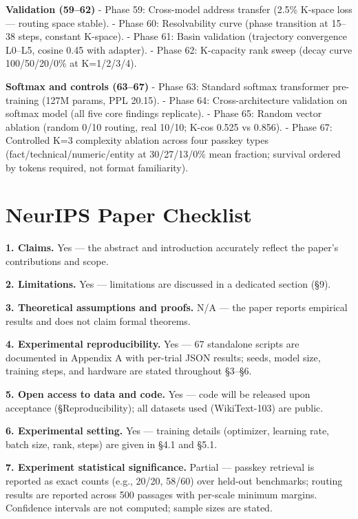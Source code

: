 \textbf{Validation (59--62)} - Phase 59: Cross-model address transfer (2.5\% K-space loss --- routing space stable). - Phase 60: Resolvability curve (phase transition at 15--38 steps, constant K-space). - Phase 61: Basin validation (trajectory convergence L0--L5, cosine 0.45 with adapter). - Phase 62: K-capacity rank sweep (decay curve 100/50/20/0\% at K=1/2/3/4).

\textbf{Softmax and controls (63--67)} - Phase 63: Standard softmax transformer pre-training (127M params, PPL 20.15). - Phase 64: Cross-architecture validation on softmax model (all five core findings replicate). - Phase 65: Random vector ablation (random 0/10 routing, real 10/10; K-cos 0.525 vs 0.856). - Phase 67: Controlled K=3 complexity ablation across four passkey types (fact/technical/numeric/entity at 30/27/13/0\% mean fraction; survival ordered by tokens required, not format familiarity).

\section{NeurIPS Paper Checklist}\label{neurips-paper-checklist}

\textbf{1. Claims.} Yes --- the abstract and introduction accurately reflect the paper's contributions and scope.

\textbf{2. Limitations.} Yes --- limitations are discussed in a dedicated section (§9).

\textbf{3. Theoretical assumptions and proofs.} N/A --- the paper reports empirical results and does not claim formal theorems.

\textbf{4. Experimental reproducibility.} Yes --- 67 standalone scripts are documented in Appendix A with per-trial JSON results; seeds, model size, training steps, and hardware are stated throughout §3--§6.

\textbf{5. Open access to data and code.} Yes --- code will be released upon acceptance (§Reproducibility); all datasets used (WikiText-103) are public.

\textbf{6. Experimental setting.} Yes --- training details (optimizer, learning rate, batch size, rank, steps) are given in §4.1 and §5.1.

\textbf{7. Experiment statistical significance.} Partial --- passkey retrieval is reported as exact counts (e.g., 20/20, 58/60) over held-out benchmarks; routing results are reported across 500 passages with per-scale minimum margins. Confidence intervals are not computed; sample sizes are stated.

